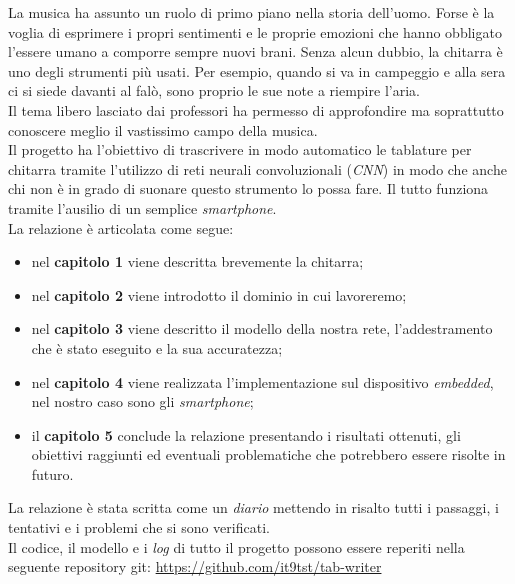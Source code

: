 La musica ha assunto un ruolo di primo piano nella storia dell'uomo. Forse è la voglia di esprimere i propri sentimenti e le proprie emozioni che hanno obbligato l'essere umano a comporre sempre nuovi brani. Senza alcun dubbio, la chitarra è uno degli strumenti più usati. Per esempio, quando si va in campeggio e alla sera ci si siede davanti al falò, sono proprio le sue note a riempire l'aria.\\ Il tema libero lasciato dai professori ha permesso di approfondire ma soprattutto conoscere meglio il vastissimo campo della musica.  \\ Il progetto ha l'obiettivo di trascrivere in modo automatico le tablature per chitarra tramite l'utilizzo di reti neurali convoluzionali (\textit{CNN}) in modo che anche chi non è in grado di suonare questo strumento lo possa fare. Il tutto funziona tramite l'ausilio di un semplice \textit{smartphone}. \\

La relazione è articolata come segue:
\begin{itemize}
	\item nel \textbf{capitolo 1} viene descritta brevemente la chitarra;
	\item nel \textbf{capitolo 2} viene introdotto il dominio in cui lavoreremo;
	\item nel \textbf{capitolo 3} viene descritto il modello della nostra rete, l'addestramento che è stato eseguito e la sua accuratezza;
	\item nel \textbf{capitolo 4} viene realizzata l'implementazione sul dispositivo \textit{embedded}, nel nostro caso sono gli \textit{smartphone};
	\item il \textbf{capitolo 5} conclude la relazione presentando i risultati ottenuti, gli obiettivi raggiunti ed eventuali problematiche che potrebbero essere risolte in futuro.
\end{itemize}
La relazione è stata scritta come un \textit{diario} mettendo in risalto tutti i passaggi, i tentativi e i problemi che si sono verificati.\\
\newline
Il codice, il modello e i \textit{log} di tutto il progetto possono essere reperiti nella seguente repository git: \href{https://github.com/it9tst/tab-writer}{https://github.com/it9tst/tab-writer} 
 